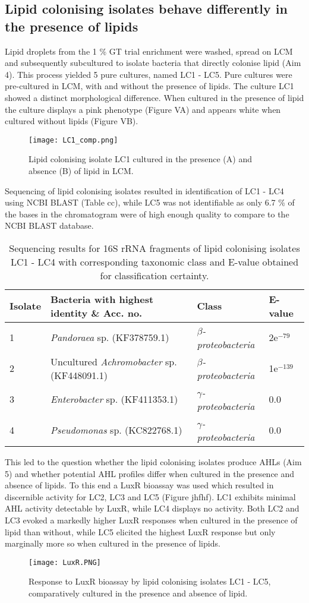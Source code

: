 \documentclass[11pt]{article}
\begin{document}
\subsection{Lipid colonising isolates behave differently in the presence of lipids}

Lipid droplets from the 1 \% GT trial enrichment were washed, spread on LCM and subsequently subcultured to isolate bacteria that directly colonise lipid (Aim 4). This process yielded 5 pure cultures, named LC1 - LC5.  Pure cultures were pre-cultured in LCM, with and without the presence of lipids. The culture LC1 showed a distinct morphological difference. When cultured in the presence of lipid the culture displays a pink phenotype (Figure VA) and appears white when cultured without lipids (Figure VB).

\begin{figure}
\texttt{[image: LC1\_comp.png]}
\caption{Lipid colonising isolate LC1 cultured in the presence (A) and absence (B) of lipid in LCM.}
\end{figure}

Sequencing of lipid colonising isolates resulted in identification of LC1 - LC4 using NCBI BLAST (Table cc), while LC5 was not identifiable as only 6.7 \% of the bases in the chromatogram were of high enough quality to compare to the NCBI BLAST database.
	
\begin{table}
\caption{Sequencing results for 16S rRNA fragments of lipid colonising isolates LC1 - LC4 with corresponding taxonomic class and E-value obtained for classification certainty.}
\begin{tabular}{ | l | p{7.8cm} | p{3cm} | l | }
\hline
Isolate & Bacteria with highest identity \& Acc. no. & Class & E-value \\
\hline
1 &  \emph{Pandoraea} sp. (KF378759.1) & \emph{$\beta$-proteobacteria} & 2e$^{-79}$ \\
\hline
2 & Uncultured \emph{Achromobacter} sp. (KF448091.1) & \emph{$\beta$-proteobacteria} & 1e$^{-139}$ \\
\hline
3 & \emph{Enterobacter} sp. (KF411353.1) & \emph{$\gamma$-proteobacteria} & 0.0 \\
\hline
4 & \emph{Pseudomonas} sp. (KC822768.1) & \emph{$\gamma$-proteobacteria} & 0.0 \\
\hline
\end{tabular}
\end{table}

This led to the question whether the lipid colonising isolates produce AHLs (Aim 5) and whether potential AHL profiles differ when cultured in the presence and absence of lipids. To this end a LuxR bioassay was used which resulted in discernible activity for LC2, LC3 and LC5 (Figure jhfhf). LC1 exhibits minimal AHL activity detectable by LuxR, while LC4 displays no activity. Both LC2 and LC3 evoked a markedly higher LuxR responses when cultured in the presence of lipid than without, while LC5 elicited the highest LuxR response but only marginally more so when cultured in the presence of lipids. 


\begin{figure}
\texttt{[image: LuxR.PNG]}
\caption{Response to LuxR bioassay by lipid colonising isolates LC1 - LC5, comparatively cultured in the presence and absence of lipid.}
\end{figure}
\FloatBarrier
\end{document}
